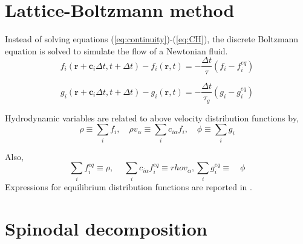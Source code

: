 \documentclass{article}
\begin{document}
\section{Lattice-Boltzmann method}
Instead of solving equations (\ref{eq:continuity})-(\ref{eq:CH}), the discrete Boltzmann equation is solved to simulate the flow of a Newtonian fluid.
\begin{equation}
	f_{i}(\textbf{r}+\textbf{c}_{i}\Delta t, t+\Delta t) - f_{i}(\textbf{r},t) = -\frac{\Delta t}{\tau}(f_{i}-f_{i}^{eq})
	\label{eq:f}
\end{equation}

\begin{equation}
g_{i}(\textbf{r}+\textbf{c}_{i}\Delta t, t+\Delta t) - g_{i}(\textbf{r},t) = -\frac{\Delta t}{\tau_{g}}(g_{i}-g_{i}^{eq})
\label{eq:g}
\end{equation}

Hydrodynamic variables are related to above velocity distribution functions by,
\begin{equation}
	\rho \equiv \sum_{i} f_{i}, \quad \rho v_{\alpha} \equiv \sum_{i} c_{i\alpha} f_{i}, \quad \phi \equiv \sum_{i} g_{i}
	\label{eq:fg}
\end{equation}

Also, 
\begin{equation}
 \sum_{i} f_{i}^{eq} \equiv \rho, \quad \  \sum_{i} c_{i\alpha} f_{i}^{eq} \equiv rho v_{\alpha}, \sum_{i} g_{i}^{eq} \equiv \quad \phi 
\label{eq:fg}
\end{equation}
Expressions for equilibrium distribution functions are reported in \cite{paper:intertial_effects}.

\section{Spinodal decomposition}
\end{document}
